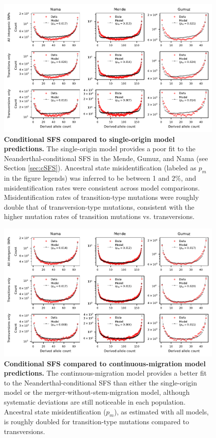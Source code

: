 \documentclass[]{article}
\begin{document}
\begin{figure}[ht]
    \centering
    \includegraphics{figures/supp-csfs-single-origin.pdf}
    \caption{
        \textbf{Conditional SFS compared to single-origin model predictions.}
        The single-origin model provides a poor fit to the Neanderthal-conditional SFS in
        the Mende, Gumuz, and Nama (see Section \ref{sec:cSFS}). Ancestral state misidentification
        (labeled as $p_m$ in the figure legends) was
        inferred to be between 1 and $2\%$, and misidentification rates were
        consistent across model comparisons. Misidentification rates of
        transition-type mutations were roughly double that of transversion-type
        mutations, consistent with the higher mutation rates of transition
        mutations vs. transversions.
    }
    \label{fig:supp-csfs-single-origin}
\end{figure}

\begin{figure}[ht]
    \centering
    \includegraphics{figures/supp-csfs-continuous-migration.pdf}
    \caption{
        \textbf{Conditional SFS compared to continuous-migration model predictions.}
        The continuous-migration model provides a better fit to the Neanderthal-conditional SFS  than
        either the single-origin model or the merger-without-stem-migration
        model, although systematic deviations are still noticeable in each
        population. Ancestral state misidentification ($p_m$), as estimated
        with all models, is roughly doubled for transition-type mutations
        compared to transversions.
    }
    \label{fig:supp-csfs-continuous-migration}
\end{figure}
\end{document}
